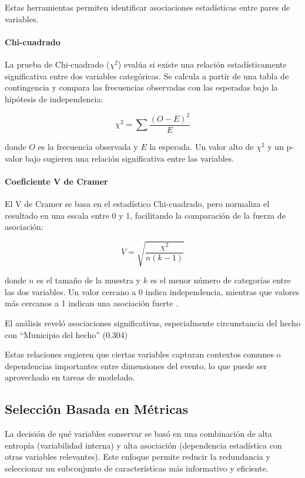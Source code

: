 \documentclass[lettersize,journal]{IEEEtran}
\begin{document}
Estas herramientas permiten identificar asociaciones estadísticas entre pares de variables.

\paragraph{Chi-cuadrado}

La prueba de Chi-cuadrado ($\chi^2$) evalúa si existe una relación estadísticamente significativa entre dos variables categóricas. Se calcula a partir de una tabla de contingencia y compara las frecuencias observadas con las esperadas bajo la hipótesis de independencia:

\[
\chi^2 = \sum \frac{(O - E)^2}{E}
\]

donde $O$ es la frecuencia observada y $E$ la esperada. Un valor alto de $\chi^2$ y un p-valor bajo sugieren una relación significativa entre las variables.

\paragraph{Coeficiente V de Cramer}

El V de Cramer se basa en el estadístico Chi-cuadrado, pero normaliza el resultado en una escala entre 0 y 1, facilitando la comparación de la fuerza de asociación:

\[
V = \sqrt{\frac{\chi^2}{n(k - 1)}}
\]

donde $n$ es el tamaño de la muestra y $k$ es el menor número de categorías entre las dos variables. Un valor cercano a 0 indica independencia, mientras que valores más cercanos a 1 indican una asociación fuerte \cite{backhaus2016multivariate}.

El análisis reveló asociaciones significativas, especialmente circunstancia del hecho con
         ``Municipio del hecho'' (0.304)


Estas relaciones sugieren que ciertas variables capturan contextos comunes o dependencias importantes entre dimensiones del evento, lo que puede ser aprovechado en tareas de modelado.

\subsection{Selección Basada en Métricas}

La decisión de qué variables conservar se basó en una combinación de alta entropía (variabilidad interna) y alta asociación (dependencia estadística con otras variables relevantes). Este enfoque permite reducir la redundancia y seleccionar un subconjunto de características más informativo y eficiente.
\end{document}

